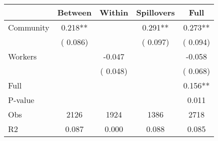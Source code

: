 
\begin{tabular}{l*{4}{c}}\hline&\multicolumn{1}{c}{Between}&\multicolumn{1}{c}{Within}&\multicolumn{1}{c}{Spillovers}&\multicolumn{1}{c}{Full}\\ \hline
 Community             &              0.218**      &                                               &        0.291** &         0.273**                            \\ 
                               &        (       0.086)           &                                       &       (       0.097)     &      (       0.094)                                           \\ 
 Workers       &                                               &       -0.047    &                                &            -0.058                            \\ 
                               &                                               & (       0.048)                  &                                        &      (       0.068)                                           \\ 
\hline                                                                                                                                                                                                                                            
 Full                  &                                               &                                               &                                        &             0.156**                                     \\ 
 P-value               &                                               &                                               &                                        &             0.011                                           \\ 
 Obs                   &               2126               &       1924                       &       1386                &              2718                                               \\ 
 R2                    &                      0.087              &              0.000                      &              0.088               &                     0.085                                              \\ 
\hline \end{tabular}                                                                                                                                                                                                              